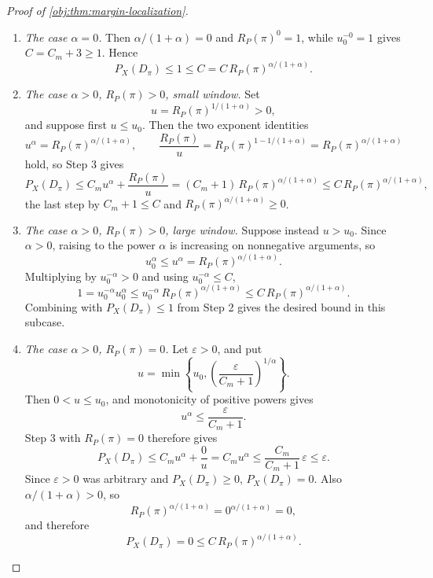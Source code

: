\documentclass[11pt]{article}
\begin{document}
\begin{proof}[Proof of \cref{obj:thm:margin-localization}]
\begin{enumerate}
\item \emph{The case \(\alpha=0\).}  Then \(\alpha/(1+\alpha)=0\) and \(R_P(\pi)^0=1\), while \(u_0^{-0}=1\) gives \(C=C_m+3\ge1\).  Hence
\[
P_X(D_\pi)\le1\le C=C\,R_P(\pi)^{\alpha/(1+\alpha)} .
\]

\item \emph{The case \(\alpha>0\), \(R_P(\pi)>0\), small window.}  Set
\[
u=R_P(\pi)^{1/(1+\alpha)}>0,
\]
and suppose first \(u\le u_0\).  Then the two exponent identities
\[
u^\alpha=R_P(\pi)^{\alpha/(1+\alpha)},
\qquad
\frac{R_P(\pi)}u=R_P(\pi)^{1-1/(1+\alpha)}=R_P(\pi)^{\alpha/(1+\alpha)}
\]
hold, so Step 3 gives
\[
P_X(D_\pi)
\le C_m u^\alpha+\frac{R_P(\pi)}u
=(C_m+1)\,R_P(\pi)^{\alpha/(1+\alpha)}
\le C\,R_P(\pi)^{\alpha/(1+\alpha)},
\]
the last step by \(C_m+1\le C\) and \(R_P(\pi)^{\alpha/(1+\alpha)}\ge0\). %

\item \emph{The case \(\alpha>0\), \(R_P(\pi)>0\), large window.}  Suppose instead \(u>u_0\).  Since \(\alpha>0\), raising to the power \(\alpha\) is increasing on nonnegative arguments, so
\[
u_0^\alpha\le u^\alpha=R_P(\pi)^{\alpha/(1+\alpha)}.
\]
Multiplying by \(u_0^{-\alpha}>0\) and using \(u_0^{-\alpha}\le C\),
\[
1=u_0^{-\alpha}u_0^\alpha
\le u_0^{-\alpha}\,R_P(\pi)^{\alpha/(1+\alpha)}
\le C\,R_P(\pi)^{\alpha/(1+\alpha)} .
\]
Combining with \(P_X(D_\pi)\le1\) from Step 2 gives the desired bound in this subcase. %

\item \emph{The case \(\alpha>0\), \(R_P(\pi)=0\).}  Let \(\varepsilon>0\), and put
\[
u=\min\left\{u_0,\left(\frac{\varepsilon}{C_m+1}\right)^{1/\alpha}\right\}.
\]
Then \(0<u\le u_0\), and monotonicity of positive powers gives
\[
u^\alpha\le \frac{\varepsilon}{C_m+1}.
\]
Step 3 with \(R_P(\pi)=0\) therefore gives
\[
P_X(D_\pi)\le C_m u^\alpha+\frac 0u
=C_m u^\alpha
\le \frac{C_m}{C_m+1}\,\varepsilon
\le \varepsilon.
\]
Since \(\varepsilon>0\) was arbitrary and \(P_X(D_\pi)\ge0\), \(P_X(D_\pi)=0\).  Also \(\alpha/(1+\alpha)>0\), so
\[
R_P(\pi)^{\alpha/(1+\alpha)}=0^{\alpha/(1+\alpha)}=0,
\]
and therefore
\[
P_X(D_\pi)=0\le C\,R_P(\pi)^{\alpha/(1+\alpha)} .
\]
\end{enumerate}
\end{proof}
\end{document}
